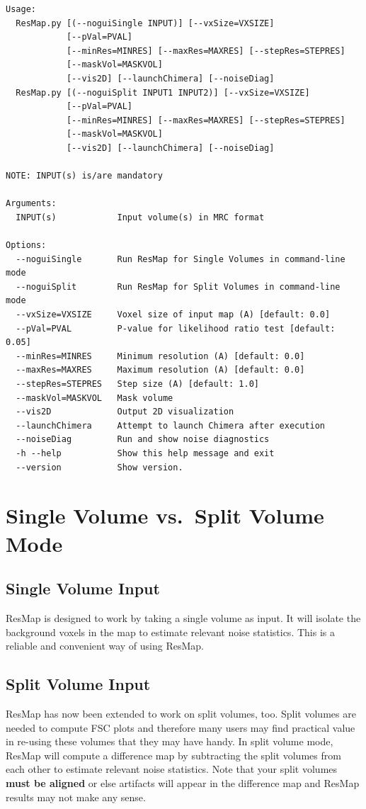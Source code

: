 \documentclass[10pt]{article}
\begin{document}
\begin{lstlisting}
Usage: 
  ResMap.py [(--noguiSingle INPUT)] [--vxSize=VXSIZE]
            [--pVal=PVAL]
            [--minRes=MINRES] [--maxRes=MAXRES] [--stepRes=STEPRES]
            [--maskVol=MASKVOL]
            [--vis2D] [--launchChimera] [--noiseDiag]
  ResMap.py [(--noguiSplit INPUT1 INPUT2)] [--vxSize=VXSIZE]
            [--pVal=PVAL]
            [--minRes=MINRES] [--maxRes=MAXRES] [--stepRes=STEPRES]
            [--maskVol=MASKVOL]
            [--vis2D] [--launchChimera] [--noiseDiag]

NOTE: INPUT(s) is/are mandatory

Arguments:
  INPUT(s)            Input volume(s) in MRC format

Options:
  --noguiSingle       Run ResMap for Single Volumes in command-line mode
  --noguiSplit        Run ResMap for Split Volumes in command-line mode
  --vxSize=VXSIZE     Voxel size of input map (A) [default: 0.0]
  --pVal=PVAL         P-value for likelihood ratio test [default: 0.05]
  --minRes=MINRES     Minimum resolution (A) [default: 0.0]       
  --maxRes=MAXRES     Maximum resolution (A) [default: 0.0]      
  --stepRes=STEPRES   Step size (A) [default: 1.0]                
  --maskVol=MASKVOL   Mask volume                                 
  --vis2D             Output 2D visualization
  --launchChimera     Attempt to launch Chimera after execution
  --noiseDiag         Run and show noise diagnostics
  -h --help           Show this help message and exit
  --version           Show version. 
\end{lstlisting}

\section{Single Volume vs.~Split Volume Mode}
\subsection{Single Volume Input}
ResMap is designed to work by taking a single volume as input. It will isolate the background voxels in the map to estimate relevant noise statistics. This is a reliable and convenient way of using ResMap.

\subsection{Split Volume Input}
ResMap has now been extended to work on split volumes, too. Split volumes are needed to compute FSC plots and therefore many users may find practical value in re-using these volumes that they may have handy. In split volume mode, ResMap will compute a difference map by subtracting the split volumes from each other to estimate relevant noise statistics. Note that your split volumes \textbf{must be aligned} or else artifacts will appear in the difference map and ResMap results may not make any sense.
\end{document}
